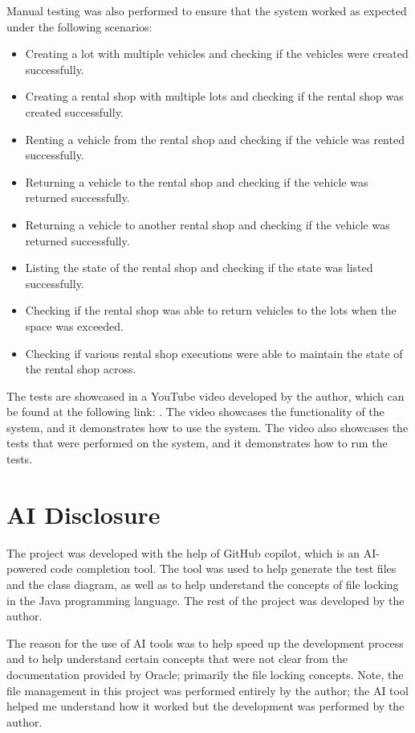 \documentclass[conference]{IEEEtran}
\begin{document}
Manual testing was also performed to ensure that the system worked as expected under the following scenarios: 
\begin{itemize}
    \item Creating a lot with multiple vehicles and checking if the vehicles were created successfully.
    \item Creating a rental shop with multiple lots and checking if the rental shop was created successfully.
    \item Renting a vehicle from the rental shop and checking if the vehicle was rented successfully.
    \item Returning a vehicle to the rental shop and checking if the vehicle was returned successfully.
    \item Returning a vehicle to another rental shop and checking if the vehicle was returned successfully.
    \item Listing the state of the rental shop and checking if the state was listed successfully.
    \item Checking if the rental shop was able to return vehicles to the lots when the space was exceeded.
    \item Checking if various rental shop executions were able to maintain the state of the rental shop across.
\end{itemize}

The tests are showcased in a YouTube video developed by the author, which can be found at the following link: \url{}. The video showcases the functionality of the system, and it demonstrates how to use the system. The video also showcases the tests that were performed on the system, and it demonstrates how to run the tests.

\section{AI Disclosure}
The project was developed with the help of GitHub copilot, which is an AI-powered code completion tool. The tool was used to help generate the test files and the class diagram, as well as to help understand the concepts of file locking in the Java programming language. The rest of the project was developed by the author. 

The reason for the use of AI tools was to help speed up the development process and to help understand certain concepts that were not clear from the documentation provided by Oracle; primarily the file locking concepts. Note, the file management in this project was performed entirely by the author; the AI tool helped me understand how it worked but the development was performed by the author. 
\end{document}
